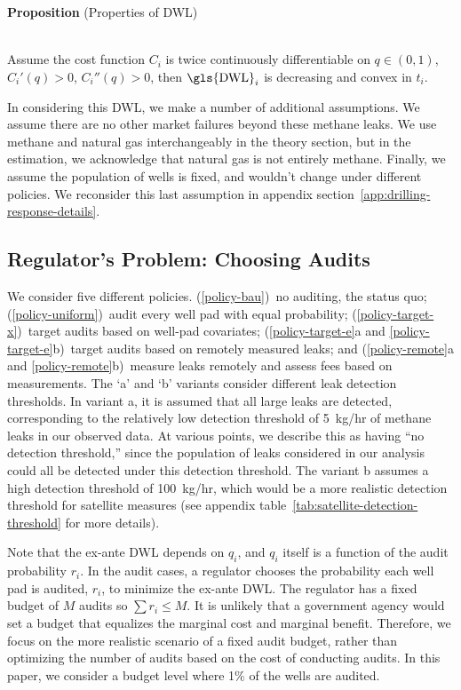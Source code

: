 \documentclass[12pt,oneside,letterpaper]{article}
\newcounter{propositioncounter}
\newlength{\premathenv}
\newlength{\withinmathenv}
\newlength{\postmathenv}
\theoremstyle{definition}
\newenvironment{proposition}[1]{%
\vspace{\premathenv}%
\refstepcounter{propositioncounter}%
\noindent\textbf{Proposition \thepropositioncounter}
{#1}
\vspace{\withinmathenv}
}{%
\vspace{\postmathenv}%
}
\begin{document}
\begin{refsection}
\begin{proposition}{(Properties of \gls{DWL})}
\label{prop_properties_of_dwl}\\
Assume the cost function \(C_i\) is twice continuously differentiable on
\(q \in (0, 1)\), \(C_i'(q) > 0\), \(C_i''(q) > 0\),
then \(\text{\gls{DWL}}_i\) is decreasing and convex in \(t_i\).
\end{proposition}


In considering this \gls{DWL}, we make a number of additional assumptions.
We assume there are no other market failures beyond these methane leaks.
We use methane and natural gas interchangeably in the theory section, but in the estimation, we acknowledge that natural gas is not entirely methane.
Finally, we assume the population of wells is fixed, and wouldn't change under different policies.
We reconsider this last assumption in appendix section~\ref{app:drilling-response-details}.



\subsection{Regulator's Problem: Choosing Audits}
\label{sec:regulator-problem-choosing-audits}



We consider five different policies.
(\ref{policy-bau})~no auditing, the status quo;
(\ref{policy-uniform})~audit every well pad with equal probability;
(\ref{policy-target-x})~target audits based on well-pad covariates;
(\ref{policy-target-e}a and \ref{policy-target-e}b)~target audits based on remotely measured leaks; and
(\ref{policy-remote}a and \ref{policy-remote}b)~measure leaks remotely and assess fees based on measurements.
The `a' and `b' variants consider different leak detection thresholds.
In variant a, it is assumed that all large leaks are detected, corresponding to the relatively low detection threshold of 5~kg/hr of methane leaks in our observed data.
At various points, we describe this as having ``no detection threshold,'' since the population of leaks considered in our analysis could all be detected under this detection threshold.
The variant b assumes a high detection threshold of 100~kg/hr, which would be a more realistic detection threshold for satellite measures
(see appendix table~\ref{tab:satellite-detection-threshold} for more details).

Note that the ex-ante \gls{DWL} depends on \(q_i\), and \(q_i\) itself is a function of the audit probability \(r_i\).
In the audit cases, a regulator chooses the probability each well pad is audited, \(r_i\),
to minimize the ex-ante \gls{DWL}.
The regulator has a fixed budget of \(M\) audits so \(\sum r_i \leq M\).
It is unlikely that a government agency would set a budget that equalizes the marginal cost and marginal benefit.
Therefore, we focus on the more realistic scenario of a fixed audit budget, rather than optimizing the number of audits based on the cost of conducting audits.
In this paper, we consider a budget level where 1\% of the wells are audited.



\end{refsection}
\end{document}
